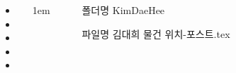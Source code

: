 \documentclass[20pt, a1paper ]{tikzposter}
\begin{document}
\begin{columns}
			{				
			\setlength{\leftmargini}{3em}			
			\setlength{\labelsep}{1em} %

			\begin{large}
			\begin{itemize}
			\item 
			\item 
			\item 
			\item 
			\item 

			\end{itemize}
			\end{large}
		}

			{
					\setlength{\leftmargini}{8em}
					\setlength{\labelsep} {1em}
				\begin{large}
					\begin{itemize}
					\item [폴더명] KimDaeHee
					\item [파일명] 김대희 물건 위치-포스트.tex 
					\end{itemize}
				\end{large}
			}


	\end{columns}
\end{document}
